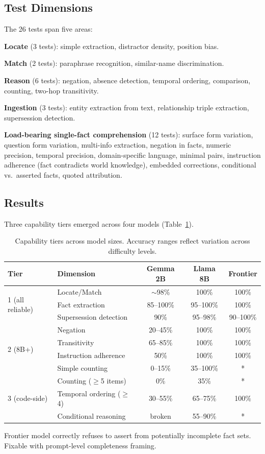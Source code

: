 \documentclass[11pt,a4paper]{article}
\begin{document}
\subsection{Test Dimensions}

The 26 tests span five areas:

\textbf{Locate} (3 tests): simple extraction, distractor density, position bias.

\textbf{Match} (2 tests): paraphrase recognition, similar-name discrimination.

\textbf{Reason} (6 tests): negation, absence detection, temporal ordering, comparison, counting, two-hop transitivity.

\textbf{Ingestion} (3 tests): entity extraction from text, relationship triple extraction, supersession detection.

\textbf{Load-bearing single-fact comprehension} (12 tests): surface form variation, question form variation, multi-info extraction, negation in facts, numeric precision, temporal precision, domain-specific language, minimal pairs, instruction adherence (fact contradicts world knowledge), embedded corrections, conditional vs.\ asserted facts, quoted attribution.

\subsection{Results}

Three capability tiers emerged across four models (Table~\ref{tab:tiers}).

\begin{table}[h]
\centering
\caption{Capability tiers across model sizes. Accuracy ranges reflect variation across difficulty levels.}
\label{tab:tiers}
\begin{tabular}{@{}llccc@{}}
\toprule
Tier & Dimension & Gemma 2B & Llama 8B & Frontier \\
\midrule
\multirow{3}{*}{1 (all reliable)} & Locate/Match & $\sim$98\% & 100\% & 100\% \\
 & Fact extraction & 85--100\% & 95--100\% & 100\% \\
 & Supersession detection & 90\% & 95--98\% & 90--100\% \\
\midrule
\multirow{4}{*}{2 (8B+)} & Negation & 20--45\% & 100\% & 100\% \\
 & Transitivity & 65--85\% & 100\% & 100\% \\
 & Instruction adherence & 50\% & 100\% & 100\% \\
 & Simple counting & 0--15\% & 35--100\% & * \\
\midrule
\multirow{3}{*}{3 (code-side)} & Counting ($\geq$5 items) & 0\% & 35\% & * \\
 & Temporal ordering ($\geq$4) & 30--55\% & 65--75\% & 100\% \\
 & Conditional reasoning & broken & 55--90\% & * \\
\bottomrule
\end{tabular}
\vspace{2pt}
\raggedright\footnotesize * Frontier model correctly refuses to assert from potentially incomplete fact sets. Fixable with prompt-level completeness framing.
\end{table}
\end{document}
